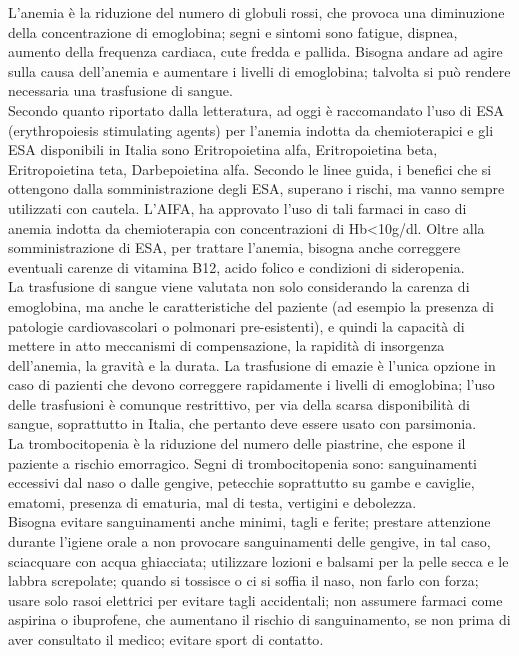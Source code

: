 L’anemia è la riduzione del numero di globuli rossi, che provoca una diminuzione della concentrazione di emoglobina; 
segni e sintomi sono fatigue, dispnea, aumento della frequenza cardiaca, cute fredda e pallida\cite{LLSLOWCELLS}.
Bisogna andare ad agire sulla causa dell’anemia e aumentare i livelli di emoglobina; talvolta si può rendere necessaria 
una trasfusione di sangue\cite{AMERICANLOWCELLS}.\\
Secondo quanto riportato dalla letteratura, ad oggi è raccomandato l’uso di ESA (erythropoiesis stimulating agents) 
per l’anemia indotta da chemioterapici e gli ESA disponibili in Italia sono Eritropoietina alfa, Eritropoietina beta, 
Eritropoietina teta, Darbepoietina alfa. Secondo le linee guida, i benefici che si ottengono dalla somministrazione 
degli ESA, superano i rischi, ma vanno sempre utilizzati con cautela. L’AIFA, ha approvato l’uso di tali farmaci 
in caso di anemia indotta da chemioterapia con concentrazioni di Hb<10g/dl\cite{AIOMTOSS}.
Oltre alla somministrazione di ESA, per trattare l’anemia, bisogna anche correggere eventuali carenze di vitamina B12, 
acido folico e condizioni di sideropenia.\\ 
La trasfusione di sangue viene valutata non solo considerando la carenza di emoglobina, ma anche le caratteristiche 
del paziente (ad esempio la presenza di patologie cardiovascolari o polmonari pre-esistenti), 
e quindi la capacità di mettere in atto meccanismi di compensazione, la rapidità di 
insorgenza dell’anemia, la gravità e la durata. La trasfusione di emazie è l’unica opzione in caso di pazienti 
che devono correggere rapidamente i livelli di emoglobina; 
l’uso delle trasfusioni è comunque restrittivo, per via della scarsa disponibilità di sangue, 
soprattutto in Italia, che pertanto deve essere usato con parsimonia\cite{AIOMTOSS}.\\

La trombocitopenia è la riduzione del numero delle piastrine, che espone il paziente a rischio emorragico. 
Segni di trombocitopenia sono: sanguinamenti eccessivi dal naso o dalle gengive, petecchie soprattutto su 
gambe e caviglie, ematomi, presenza di ematuria, mal di testa, vertigini e debolezza\cite{LLSLOWCELLS}.\\
Bisogna evitare sanguinamenti anche minimi, tagli e ferite; prestare attenzione durante l’igiene orale a non 
provocare sanguinamenti delle gengive, in tal caso, sciacquare con acqua ghiacciata; utilizzare lozioni e balsami 
per la pelle secca e le labbra screpolate; quando si tossisce o ci si soffia il naso, non farlo con forza; 
usare solo rasoi elettrici per evitare tagli accidentali; non assumere farmaci come aspirina o ibuprofene, 
che aumentano il rischio di sanguinamento, se non prima di aver consultato il medico; evitare sport di 
contatto\cite{AMERICANPLATELET}.


